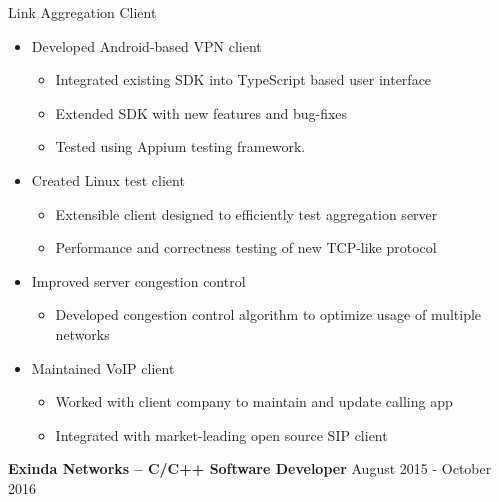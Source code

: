 \documentclass{res}
\begin{document}
\begin{resume}
         \vspace{-5mm}
         Link Aggregation Client
         \begin{itemize}
         \item Developed Android-based VPN client
           \begin{itemize}
           \item Integrated existing SDK into TypeScript based user interface
           \item Extended SDK with new features and bug-fixes
           \item Tested using Appium testing framework.
           \end{itemize}
         \item Created Linux test client
           \begin{itemize}
           \item Extensible client designed to efficiently test aggregation server
           \item Performance and correctness testing of new TCP-like protocol
           \end{itemize}
         \item Improved server congestion control
           \begin{itemize}
           \item Developed congestion control algorithm to optimize usage of multiple networks
           \end{itemize}
         \item Maintained VoIP client
           \begin{itemize}
            \item Worked with client company to maintain and update calling app
            \item Integrated with market-leading open source SIP client
           \end{itemize}
         \end{itemize}

         \vspace{-3mm}
         {\bf Exinda Networks -- C/C++ Software Developer} \hfill August 2015 - October 2016\vspace{-3mm}


\end{resume}
\end{document}
